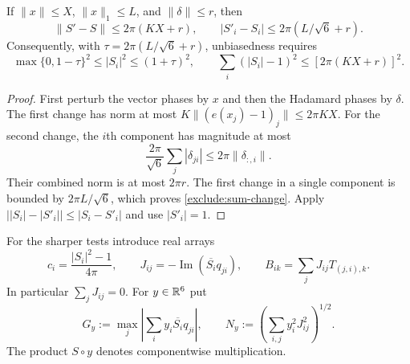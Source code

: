 \begin{lemma}
\label{exclude:direct-single}
If $\|x\|\le X$, $\|x\|_1\le L$, and $\|\delta\|\le r$, then
\begin{equation}
 \|S'-S\|\le2\pi(KX+r),\qquad
 |S'_i-S_i|\le2\pi(L/\sqrt6+r).
 \label{exclude:sum-change}
\end{equation}
Consequently, with $\tau=2\pi(L/\sqrt6+r)$, unbiasedness requires
\begin{equation}
 \max\{0,1-\tau\}^2\le |S_i|^2\le(1+\tau)^2,
 \qquad
 \sum_i(|S_i|-1)^2\le[2\pi(KX+r)]^2.
 \label{exclude:direct-tests}
\end{equation}
\end{lemma}
\begin{proof}
First perturb the vector phases by $x$ and then the Hadamard phases by
$\delta$.  The first change has norm at most
$K\|(e(x_j)-1)_j\|\le2\pi KX$.
For the second change, the $i$th component has magnitude at most
\[
 \frac{2\pi}{\sqrt6}\sum_j|\delta_{ji}|
 \le2\pi\|\delta_{:,i}\|.
\]
Their combined norm is at most $2\pi r$.
The first change in a single component is bounded by $2\pi L/\sqrt6$,
which proves \eqref{exclude:sum-change}.
Apply $\bigl||S_i|-|S'_i|\bigr|\le|S_i-S'_i|$ and use $|S'_i|=1$.
\end{proof}

For the sharper tests introduce real arrays
\begin{equation}
 c_i=\frac{|S_i|^2-1}{4\pi},\qquad
 J_{ij}=-\operatorname{Im}(\overline{S_i}q_{ji}),\qquad
 B_{ik}=\sum_j J_{ij}T_{(j,i),k}.
 \label{exclude:single-linearization}
\end{equation}
In particular $\sum_jJ_{ij}=0$.  For $y\in\mathbb R^6$ put
\[
 G_y:=\max_j\left|\sum_i y_i\overline{S_i}q_{ji}\right|,
 \qquad
 N_y:=\left(\sum_{i,j}y_i^2J_{ij}^2\right)^{1/2}.
\]
The product $S\circ y$ denotes componentwise multiplication.

